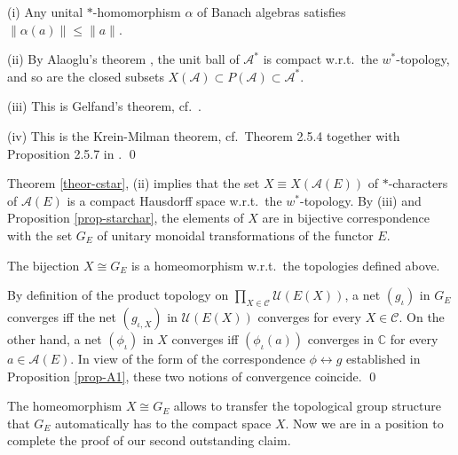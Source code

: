 \documentclass[12pt]{article}
\theoremstyle{definition}
\theoremstyle{definition}
\theoremstyle{remark}
\def\2#1{{\mathcal #1}}
\def\7#1{{\mathbb #1}}
\begin{document}
\prf (i) Any unital $*$-homomorphism $\alpha$ of Banach algebras satisfies $\|\alpha(a)\|\le\|a\|$.

(ii) By Alaoglu's theorem \cite[Theorem 2.5.2]{ped}, the unit ball of $\2A^*$ is compact w.r.t.\ the
$w^*$-topology, and so are the closed subsets $X(\2A)\subset P(\2A)\subset\2A^*$. 

(iii) This is Gelfand's theorem, cf.\ \cite[Theorem 4.3.13]{ped}.

(iv) This is the Krein-Milman theorem, cf.\ Theorem 2.5.4 together with Proposition 2.5.7 in
\cite{ped}. 
\qed

Theorem \ref{theor-cstar}, (ii) implies that the set $X\equiv X(\2A(E))$ of $*$-characters of
$\2A(E)$ is a compact Hausdorff space w.r.t.\ the $w^*$-topology. By (iii) and Proposition
\ref{prop-starchar}, the elements of $X$ are in bijective correspondence with the set $G_E$ of
unitary monoidal transformations of the functor $E$.    

\blemma
The bijection $X\cong G_E$ is a homeomorphism w.r.t.\ the topologies defined above.
\elemma

\prf By definition of the product topology on $\prod_{X\in\2C}\2U(E(X))$, a net $(g_\iota)$ in $G_E$
converges iff the net $(g_{\iota,X})$ in $\2U(E(X))$ converges for every $X\in\2C$. On the other
hand, a net $(\phi_\iota)$ in $X$ converges iff $(\phi_\iota(a))$ converges in $\7C$ for every
$a\in\2A(E)$. In view of the form of the  correspondence $\phi\leftrightarrow g$ established in
Proposition \ref{prop-A1}, these two notions of convergence coincide.
\qed

The homeomorphism $X\cong G_E$ allows to transfer the topological group structure that $G_E$
automatically has to the compact space $X$. Now we are in a position to complete the proof of our
second outstanding claim. \\
\end{document}
